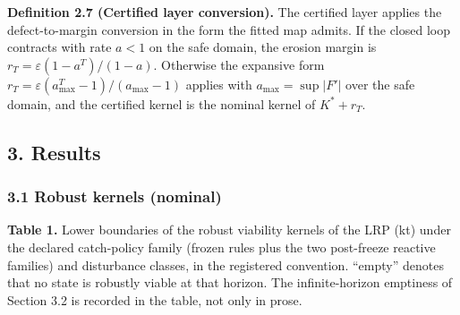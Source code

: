 \documentclass[11pt]{article}
\begin{document}
\textbf{Definition 2.7 (Certified layer conversion).} The certified
layer applies the defect-to-margin conversion in the form the fitted map
admits. If the closed loop contracts with rate \(a < 1\) on the safe
domain, the erosion margin is \(r_T = \varepsilon(1-a^T)/(1-a)\).
Otherwise the expansive form
\(r_T = \varepsilon(a_{\max}^T - 1)/(a_{\max} - 1)\) applies with
\(a_{\max} = \sup|F'|\) over the safe domain, and the certified kernel
is the nominal kernel of \(K^* + r_T\).

\subsection{3. Results}\label{results}

\subsubsection{3.1 Robust kernels
(nominal)}\label{robust-kernels-nominal}

\textbf{Table 1.} Lower boundaries of the robust viability kernels of
the LRP (kt) under the declared catch-policy family (frozen rules plus
the two post-freeze reactive families) and disturbance classes, in the
registered convention. ``empty'' denotes that no state is robustly
viable at that horizon. The infinite-horizon emptiness of Section 3.2 is
recorded in the table, not only in prose.
\end{document}
